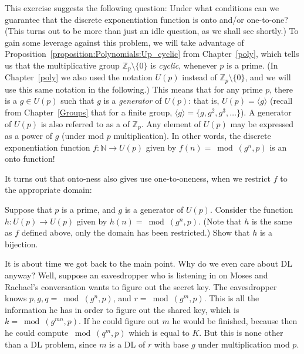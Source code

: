 This exercise suggests the following question:  Under what conditions can we guarantee that the discrete exponentiation function is onto and/or one-to-one? (This turns out to be more than just an idle question, as we shall see shortly.)  To gain some leverage against this problem, we will take advantage of   Proposition~\ref{proposition:Polynomials:Up_cyclic} from Chapter~\ref{poly}, which tells us that the multiplicative group $\mathbb{Z}_p\setminus \{0\}$ is \emph{cyclic}, whenever $p$ is a prime. (In Chapter~\ref{poly} we also used the notation $U(p)$ instead of $\mathbb{Z}_p\setminus \{0\}$, and we will use this same notation in the following.) This means that for any prime $p$, there is a $g \in U(p)$  such that $g$ is a \emph{generator} of  $U(p)$: that is, $U(p) = \langle g \rangle$ (recall from Chapter~\ref{Groups} that for a finite group, $\langle g \rangle = \{g, g^2, g^3, \ldots \}$). A generator of $U(p)$ is also referred to as a  of $\mathbb{Z}_p$. Any element of $U(p)$ may be expressed as a power of $g$ (under mod $p$ multiplication).  In other words, the discrete exponentiation function $f: \mathbb{N} \rightarrow U(p)$ given by $f(n) = \bmod(g^n,p)$ is an onto function!  

It turns out that onto-ness also gives use one-to-oneness, when we restrict $f$ to the appropriate domain:

\begin{exercise}{} 
Suppose that $p$ is a prime, and $g$ is a generator of $U(p)$.  Consider the function $h: U(p) \rightarrow U(p)$ given by $h(n) = \bmod(g^n,p)$.  (Note that $h$ is the same as $f$ defined above, only the domain has been restricted.)  Show that $h$ is a bijection.
\end{exercise}

It is about time we got back to the main point. Why do we even care about DL anyway? Well, suppose an eavesdropper who is listening in on Moses and Rachael's conversation wants to figure out the secret key. 
The eavesdropper knows $p, g, q=\bmod(g^n,p)$, and $r=\bmod(g^m,p)$.  This is all the information he has in order to figure out the shared key, which is  $k=\bmod(g^{mn},p)$. If he could figure out $m$ he would be finished, because then he could compute $\bmod(q^m,p)$ which is equal to $K$. But this is none other than a DL problem, since $m$ is a DL of $r$ with base $g$ under multiplication mod $p$.  


